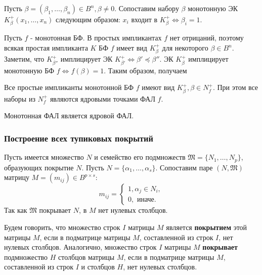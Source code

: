 \documentclass[11pt]{article}
\newcounter{th}\setcounter{th}{0}
\newcounter{cnsqnc}\setcounter{cnsqnc}{0}
\def\cnsqnc{\par\smallskip\refstepcounter{cnsqnc}\textbf{\arabic{cnsqnc}}}
\newtheorem*{Consequence}{Следствие \cnsqnc}
\newcounter{stnmt}\setcounter{stnmt}{0}
\def\st{\par\smallskip\refstepcounter{stnmt}\textbf{\arabic{stnmt}}}
\newtheorem*{Statement}{Утверждение \st}
\begin{document}
Пусть \(\beta = (\beta_1, \ldots, \beta_n) \in B^n, \beta \neq 0\). Сопоставим набору \(\beta\)
монотонную ЭК \(K_\beta^+(x_1, \ldots, x_n)\) следующим образом: \(x_i\) входит в
\(K_{\beta}^+ \Leftrightarrow \beta_i = 1\).

Пусть \(f\) - монотонная БФ. В простых импликантах \(f\) нет отрицаний, поэтому всякая простая
импликанта \(K\) БФ \(f\) имеет вид \(K_{\beta}^+\) для некоторого \(\beta \in B^n\). Заметим, что
\(K_{\beta''}^+\) имплицирует ЭК \(K_{\beta'}^+ \Leftrightarrow \beta' \preceq \beta''\).
ЭК \(K_{\beta}^+\) имплицирует монотонную БФ \(f \Leftrightarrow f(\beta) = 1\). Таким образом,
получаем
\begin{Statement}
Все простые импликанты монотонной БФ $f$ имеют вид $K_{\beta}^+, \beta \in N_f^+$.
При этом все наборы из $N_f^+$ являются ядровыми точками ФАЛ $f$.
\end{Statement}
\begin{Consequence}
Монотонная ФАЛ является ядровой ФАЛ.
\end{Consequence}
\subsubsection{Построение всех тупиковых покрытий}
\label{sec:orgd028fa2}
Пусть имеется множество \(N\) и семейство его подмножеств \(\mathfrak{M} = \{N_1, \ldots, N_p\}\),
образующих покрытие \(N\). Пусть \(N = \{\alpha_1, \ldots, \alpha_s\}\). Сопоставим паре
\((N, \mathfrak{M})\) матрицу \(M = (m_{ij}) \in B^{p\times s}\):
\begin{equation*}
m_{ij} = \begin{cases}
1, \alpha_j \in N_i, \\
0, \text{ иначе.}
\end{cases}
\end{equation*}
Так как \(\mathfrak{M}\) покрывает \(N\), в \(M\) нет нулевых столбцов.

Будем говорить, что множество строк \(I\) матрицы \(M\) является \textbf{покрытием} этой матрицы \(M\),
если в подматрице матрицы \(M\), составленной из строк \(I\), нет нулевых столбцов. Аналогично,
множество строк \(I\) матрицы \(M\) \textbf{покрывает} подмножество \(H\) столбцов матрицы \(M\), если в
подматрице матрицы \(M\), составленной из строк \(I\) и столбцов \(H\), нет нулевых столбцов.
\end{document}
